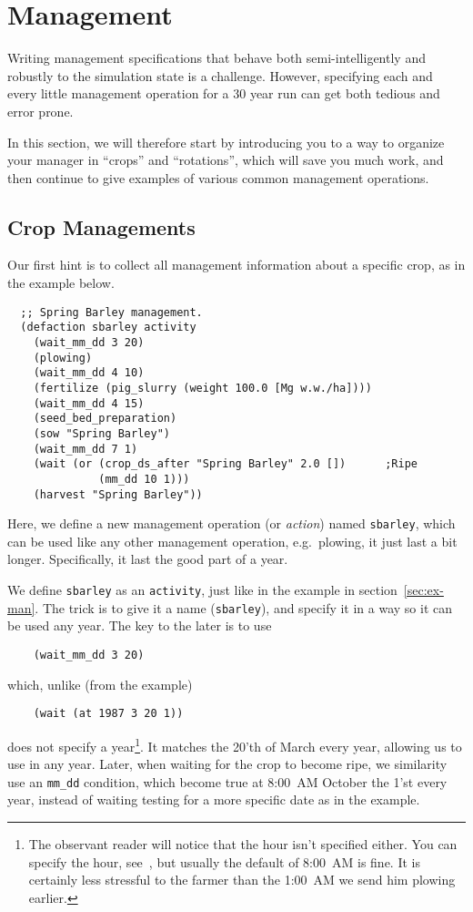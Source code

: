 \documentclass[a4paper,11pt]{article}
\begin{document}
\section{Management}
\label{sec:management}

Writing management specifications that behave both semi-intelligently
and robustly to the simulation state is a challenge.  However,
specifying each and every little management operation for a 30 year
run can get both tedious and error prone.

In this section, we will therefore start by introducing you to a way
to organize your manager in ``crops'' and ``rotations'', which will
save you much work, and then continue to give examples of various
common management operations.

\subsection{Crop Managements}
\label{sec:crop-man}

Our first hint is to collect all management information about a
specific crop, as in the example below.
\begin{verbatim}
  ;; Spring Barley management.
  (defaction sbarley activity
    (wait_mm_dd 3 20)
    (plowing)
    (wait_mm_dd 4 10)
    (fertilize (pig_slurry (weight 100.0 [Mg w.w./ha])))
    (wait_mm_dd 4 15)
    (seed_bed_preparation)
    (sow "Spring Barley")
    (wait_mm_dd 7 1)
    (wait (or (crop_ds_after "Spring Barley" 2.0 [])      ;Ripe
              (mm_dd 10 1)))
    (harvest "Spring Barley"))
\end{verbatim}
Here, we define a new management operation (or \emph{action}) named
\texttt{sbarley}, which can be used like any other management
operation, e.g.\ plowing, it just last a bit longer.  Specifically, it
last the good part of a year.

We define \texttt{sbarley} as an \texttt{activity}, just like in the
example in section~\ref{sec:ex-man}.  The trick is to give it a name
(\texttt{sbarley}), and specify it in a way so it can be used any
year.  The key to the later is to use
\begin{verbatim}
    (wait_mm_dd 3 20)
\end{verbatim}
which, unlike (from the example)
\begin{verbatim}
    (wait (at 1987 3 20 1))
\end{verbatim}
does not specify a year\footnote{The observant reader will notice that
  the hour isn't specified either.  You can specify the hour,
  see~\cite{dina81}, but usually the default of 8:00~AM is fine.  It
  is certainly less stressful to the farmer than the 1:00~AM we send
  him plowing earlier.}.  It matches the 20'th of March every year,
allowing us to use in any year.  Later, when waiting for the crop to
become ripe, we similarity use an \texttt{mm\_dd} condition, which
become true at 8:00~AM October the 1'st every year, instead of waiting
testing for a more specific date as in the example.
\end{document}
